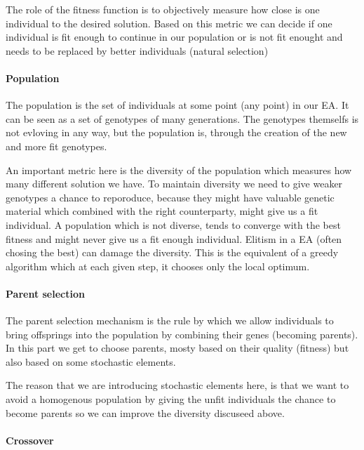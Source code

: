 \documentclass[11pt]{article}
\begin{document}
The role of the fitness function is to objectively measure how close is
one individual to the desired solution. Based on this metric we can
decide if one individual is fit enough to continue in our population or
is not fit enought and needs to be replaced by better individuals
(natural selection)

\hypertarget{population}{%
\paragraph{Population}\label{population}}

The population is the set of individuals at some point (any point) in
our EA. It can be seen as a set of genotypes of many generations. The
genotypes themselfs is not evloving in any way, but the population is,
through the creation of the new and more fit genotypes.

An important metric here is the diversity of the population which
measures how many different solution we have. To maintain diversity we
need to give weaker genotypes a chance to reporoduce, because they might
have valuable genetic material which combined with the right
counterparty, might give us a fit individual. A population which is not
diverse, tends to converge with the best fitness and might never give us
a fit enough individual. Elitism in a EA (often chosing the best) can
damage the diversity. This is the equivalent of a greedy algorithm which
at each given step, it chooses only the local optimum.

\hypertarget{parent-selection}{%
\paragraph{Parent selection}\label{parent-selection}}

The parent selection mechanism is the rule by which we allow individuals
to bring offsprings into the population by combining their genes
(becoming parents). In this part we get to choose parents, mosty based
on their quality (fitness) but also based on some stochastic elements.

The reason that we are introducing stochastic elements here, is that we
want to avoid a homogenous population by giving the unfit individuals
the chance to become parents so we can improve the diversity discuseed
above.

\hypertarget{crossover}{%
\paragraph{Crossover}\label{crossover}}
\end{document}

